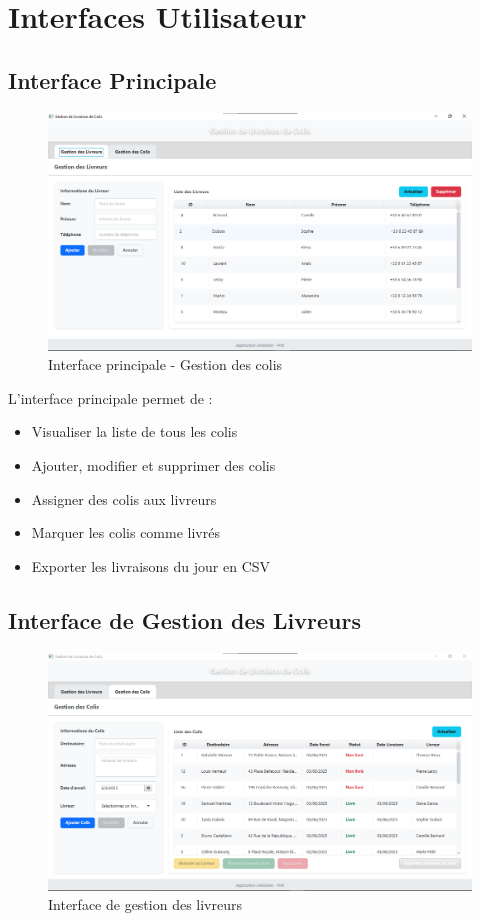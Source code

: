 \documentclass{rapportENSIAS}
\begin{document}
\section{Interfaces Utilisateur}

\subsection{Interface Principale}

\begin{figure}[H]
    \centering
    \includegraphics[width=\textwidth]{interface1.png}
    \caption{Interface principale - Gestion des colis}
    \label{fig:interface1}
\end{figure}

L'interface principale permet de :
\begin{itemize}
    \item Visualiser la liste de tous les colis
    \item Ajouter, modifier et supprimer des colis
    \item Assigner des colis aux livreurs
    \item Marquer les colis comme livr\'{e}s
    \item Exporter les livraisons du jour en CSV
\end{itemize}

\subsection{Interface de Gestion des Livreurs}

\begin{figure}[H]
    \centering
    \includegraphics[width=\textwidth]{interface2.png}
    \caption{Interface de gestion des livreurs}
    \label{fig:interface2}
\end{figure}
\end{document}
